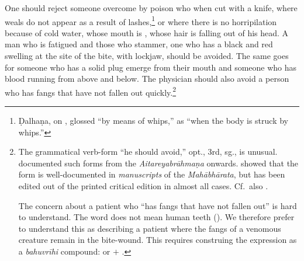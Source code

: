 \begin{translation}[resume]
 \item [3.40cd--3.43ab]  
 
One should reject someone overcome by poison who  
when cut with a knife, where weals do not appear as a result of  
 lashes,\footnote{Ḍalhaṇa, on , glossed  
“by means of whips,” as “when the body is struck by whips.”} or where 
there is no horripilation because of cold water, whose mouth is 
, whose hair is falling out of his head.  A man who is 
fatigued and those who stammer, 
one who has a black and red swelling at the site of the bite, with
lockjaw, should be avoided.  The same goes for someone who has a solid
plug emerge from their mouth  and someone who has blood running from
above and below.
% 
% 
The physician should also avoid a person who has fangs that have not
fallen out quickly.\footnote{The grammatical verb-form
     “he  should avoid,” opt., 3rd, sg., is unusual.
    \citet[10\,ff]{reno-1940} documented such forms from the
    \emph{Aitareyabrāhmaṇa} onwards.  \citet[\P  6.3.3 “Peculiar optative
    endings”, pp.\,176--177]{ober-2003} showed that the form is
    well-documented in \emph{manuscripts} of the \emph{Mahābhārata}, but
    has been edited out of the printed critical edition in almost all
    cases. Cf.\ also \cite{kuli-2006}.  
    
    The concern about a patient who “has fangs that have not fallen
out” is hard  to understand.  The word  does not mean
human teeth  ().  We therefore prefer to understand
this as describing a patient where the  fangs of a venomous
creature remain in the bite-wound.  This requires  construing the
expression as a \emph{bahuvrīhi} compound:  or
 $+$ .}
\end{translation}
